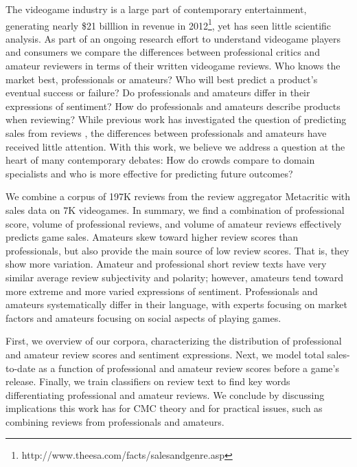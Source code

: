 \documentclass{sig-alternate}
\begin{document}
The videogame industry is a large part of contemporary entertainment, generating nearly \$21 billlion in revenue in 2012\footnote{http://www.theesa.com/facts/salesandgenre.asp}, yet has seen little scientific analysis.
As part of an ongoing research effort to understand videogame players and consumers we compare the differences between professional critics and amateur reviewers in terms of their written videogame reviews. 
Who knows the market best, professionals or amateurs? Who will best predict a
product's eventual success or failure? Do professionals and amateurs
differ in their expressions of sentiment? How do professionals and
amateurs describe products when reviewing? While previous work has
investigated the question of predicting sales from reviews
\cite{chevalier2003effect, dellarocas2007exploring, duan2008online, forman2008examining, gruhl2005predictive, liu2001word, yu2012mining},
the differences between professionals and amateurs have received little
attention. With this work, we believe we address a question at the heart
of many contemporary debates: How do crowds compare to domain
specialists and who is more effective for predicting future outcomes?

We combine a corpus of 197K reviews from 
the review aggregator Metacritic with sales data on 7K videogames. In summary, we find a
combination of professional score, volume of professional reviews,
and volume of amateur reviews effectively predicts game sales. Amateurs
skew toward higher review scores than professionals, but also
provide the main source of low review scores. That is, they show more
variation. 
Amateur and professional short review texts have very similar 
average review subjectivity and polarity; however, amateurs tend toward
more extreme and more varied expressions of sentiment. 
Professionals and amateurs systematically differ in their language, with
experts focusing on market factors and amateurs focusing on
social aspects of playing games.

First, we overview of our corpora, characterizing the
distribution of professional and amateur review scores and sentiment
expressions. Next, we model total sales-to-date as a function of 
professional and amateur review scores before a game's release. Finally,
we train classifiers on review text to find key words differentiating
professional and amateur reviews. We conclude by discussing
implications this work has for CMC theory and for practical
issues, such as combining reviews from professionals and amateurs.
\end{document}
